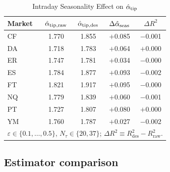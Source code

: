 \documentclass[conference]{IEEEtran}
\begin{document}
\begin{table}[!t]
\begin{center}
\caption{Intraday Seasonality Effect on $\hat{\alpha}_{\mathrm{tip}}$}
\begin{tabular}{lcccc}
\hline
Market & $\hat{\alpha}_{\mathrm{tip,raw}}$ & $\hat{\alpha}_{\mathrm{tip,des}}$
       & $\Delta\hat{\alpha}_{\mathrm{seas}}$ & $\Delta R^2$ \\
\hline
CF & 1.770 & 1.855 & $+$0.085 & $-$0.001 \\
DA & 1.718 & 1.783 & $+$0.064 & $+$0.000 \\
ER & 1.747 & 1.781 & $+$0.034 & $-$0.000 \\
ES & 1.784 & 1.877 & $+$0.093 & $-$0.002 \\
FT & 1.821 & 1.917 & $+$0.095 & $-$0.000 \\
NQ & 1.779 & 1.839 & $+$0.060 & $-$0.001 \\
PT & 1.727 & 1.807 & $+$0.080 & $+$0.000 \\
YM & 1.760 & 1.787 & $+$0.027 & $-$0.002 \\
\hline
\multicolumn{5}{l}{$\varepsilon\in\{0.1,\ldots,0.5\}$, $N_\tau\in\{20,37\}$;
  $\Delta R^2 \equiv R^2_{\mathrm{des}} - R^2_{\mathrm{raw}}$.}
\end{tabular}
\label{tab:seasonality}
\end{center}
\end{table}


\subsection{Estimator comparison}
\label{sec:results:estimators}
\end{document}
